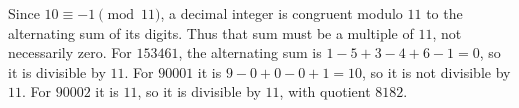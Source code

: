 Since $10\equiv-1\pmod{11}$, a decimal integer is congruent modulo $11$ to the alternating sum of its digits. Thus that sum must be a multiple of $11$, not necessarily zero. For $153461$, the alternating sum is $1-5+3-4+6-1=0$, so it is divisible by $11$. For $90001$ it is $9-0+0-0+1=10$, so it is not divisible by $11$. For $90002$ it is $11$, so it is divisible by $11$, with quotient $8182$.
